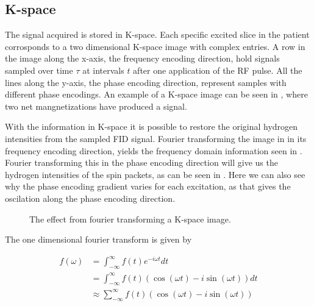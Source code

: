 \subsection{K-space}

The signal acquired is stored in K-space. Each specific excited slice
in the patient corrosponds to a two dimensional K-space image with
complex entries. A row in the image along the x-axis, the frequency
encoding direction, hold signals sampled over time $\tau$ at intervals
$t$ after one application of the RF pulse. All the lines along the
y-axis, the phase encoding direction, represent samples with different
phase encodings. An example of a K-space image can be seen in
, where two net mangnetizations have produced a
signal.

With the information in K-space it is possible to restore the original
hydrogen intensities from the sampled FID signal. Fourier transforming
the image in  in its frequency encoding direction,
yields the frequency domain information seen in
. Fourier transforming this in the phase
encoding direction will give us the hydrogen intensities of the spin
packets, as can be seen in . Here we can also
see why the phase encoding gradient varies for each excitation, as
that gives the oscilation along the phase encoding direction.



\begin{figure}
  \centering
  \caption{The effect from fourier transforming a K-space image.}
  \label{fig:kSpaceTransformations}
\end{figure}

The one dimensional fourier transform is given by 

\begin{displaymath}
  \begin{array}{rl}
    f(\omega) &= \int^\infty_{-\infty}f(t)e^{-i \omega t} dt \\
    &= \int^\infty_{-\infty}f(t)(\cos(\omega t) - i \sin(\omega t)) dt \\
    &\approx \sum^\infty_{-\infty}f(t)(\cos(\omega t) - i \sin(\omega t))
  \end{array}
\end{displaymath}

